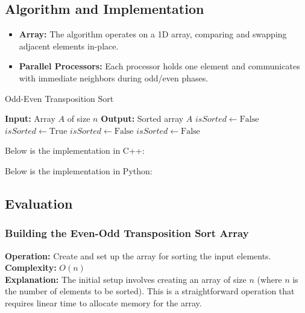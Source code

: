 \subsection{Algorithm and Implementation}
\begin{itemize}
    \item \textbf{Array:} The algorithm operates on a 1D array, comparing and swapping adjacent elements in-place.
    \item \textbf{Parallel Processors:} Each processor holds one element and communicates with immediate neighbors during odd/even phases.
\end{itemize}

\begin{algorithm}
    \caption{Odd-Even Transposition Sort}
    \begin{algorithmic}[1]
        \State \textbf{Input:} Array $A$ of size $n$
        \State \textbf{Output:} Sorted array $A$
            \State $isSorted \gets \text{False}$
                \State $isSorted \gets \text{True}$
                        \State {}
                        \State $isSorted \gets \text{False}$
                    \EndIf
                \EndFor
                        \State {}
                        \State $isSorted \gets \text{False}$
                    \EndIf
                \EndFor
            \EndWhile
        \EndFunction
    \end{algorithmic}
\end{algorithm}

\begin{minipage}{\linewidth}
    Below is the implementation in C++:
    
\end{minipage}

Below is the implementation in Python:


\subsection{Evaluation}
\subsubsection{Building the Even-Odd Transposition Sort Array}
\textbf{Operation:} Create and set up the array for sorting the input elements. \\
\textbf{Complexity:} $O(n)$ \\
\textbf{Explanation:} The initial setup involves creating an array of size $n$ (where $n$ is the number of elements to be sorted). This is a straightforward operation that requires linear time to allocate memory for the array.

